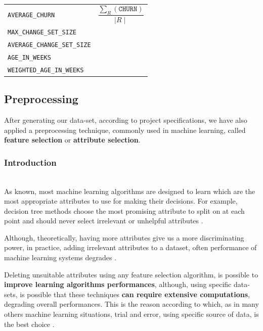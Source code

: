 \documentclass[sigconf]{acmart}
\begin{document}
\begin{table}
\begin{tabular}{l|p{6cm}}
\\

\texttt{AVERAGE\_CHURN} & $\dfrac{\sum_R (\texttt{CHURN})}{\mid R \mid}$

\\

\texttt{MAX\_CHANGE\_SET\_SIZE} &

\\

\texttt{AVERAGE\_CHANGE\_SET\_SIZE} &

\\

\texttt{AGE\_IN\_WEEKS} & 

\\

\texttt{WEIGHTED\_AGE\_IN\_WEEKS} & 

\\

\bottomrule
\end{tabular}
\end{table}

\subsection{Preprocessing}

After generating our data-set, according to project specifications, we have also applied a preprocessing technique, commonly used in machine learning, called \textbf{feature selection} or \textbf{attribute selection}. 

\subsubsection{Introduction}
\hfill\\
As known, most machine learning algorithms are designed to learn which are the most appropriate attributes to use for making their decisions. For example, decision tree methods choose the most promising attribute to split on at each point and should never select irrelevant or unhelpful attributes \cite{FalessiDataMining}. 

Although, theoretically, having more attributes give us a more discriminating power, in practice, adding irrelevant attributes to a dataset, often performance of machine learning systems degrades \cite{FalessiDataMining}. 

Deleting unsuitable attributes using any feature selection algorithm, is possible to \textbf{improve learning algorithms performances}, although, using specific data-sets, is possible that these techniques \textbf{can require extensive computations}, degrading overall performances. This is the reason according to which, as in many others machine learning situations, trial and error, using specific source of data, is the best choice \cite{FalessiDataMining}.
\end{document}

